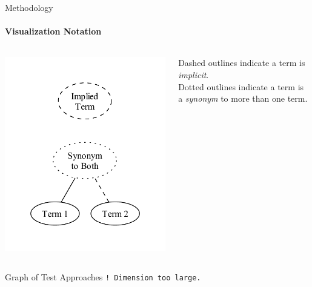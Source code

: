 \begin{frame}[t]{Methodology}
    \framesubtitle{Visualization Notation}
    \begin{columns}[T]
        \begin{column}{.5\textwidth}
            \vspace{-0.5cm}
            \centering
            \includegraphics[width=\linewidth]{assets/graphs/manual/catRels8.pdf}
        \end{column}
        \begin{column}{.5\textwidth}
            \vspace{0.75cm}
            Dashed outlines indicate a term is \emph{implicit}.\\
            \vspace{1.3cm}
            Dotted outlines indicate a term is a \emph{synonym} to more than one term.
        \end{column}
    \end{columns}
\end{frame}

\begin{frame}{Graph of Test Approaches}
    \pause \large \centering \texttt{! Dimension too large.}
\end{frame}

